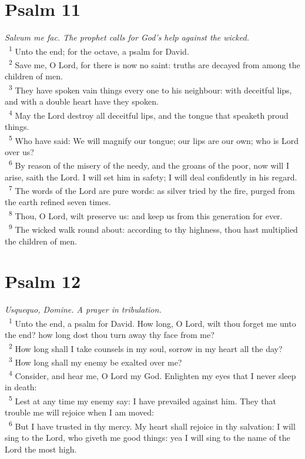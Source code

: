 \documentclass[a5paper,12pt]{article}
\begin{document}
\begin{multicols*}{2}
\section{Psalm 11}
\label{sec:org908cd06}
\emph{Salvum me fac. The prophet calls for God's help against the wicked.}\\

~\textsuperscript{1} Unto the end; for the octave, a psalm for David.\\
~\textsuperscript{2} Save me, O Lord, for there is now no saint: truths are decayed from among the children of men.\\
~\textsuperscript{3} They have spoken vain things every one to his neighbour: with deceitful lips, and with a double heart have they spoken.\\
~\textsuperscript{4} May the Lord destroy all deceitful lips, and the tongue that speaketh proud things.\\
~\textsuperscript{5} Who have said: We will magnify our tongue; our lips are our own; who is Lord over us?\\
~\textsuperscript{6} By reason of the misery of the needy, and the groans of the poor, now will I arise, saith the Lord. I will set him in safety; I will deal confidently in his regard.\\
~\textsuperscript{7} The words of the Lord are pure words: as silver tried by the fire, purged from the earth refined seven times.\\
~\textsuperscript{8} Thou, O Lord, wilt preserve us: and keep us from this generation for ever.\\
~\textsuperscript{9} The wicked walk round about: according to thy highness, thou hast multiplied the children of men.\\

\section{Psalm 12}
\label{sec:orgb829b37}
\emph{Usquequo, Domine. A prayer in tribulation.}\\

~\textsuperscript{1} Unto the end, a psalm for David. How long, O Lord, wilt thou forget me unto the end? how long dost thou turn away thy face from me?\\
~\textsuperscript{2} How long shall I take counsels in my soul, sorrow in my heart all the day?\\
~\textsuperscript{3} How long shall my enemy be exalted over me?\\
~\textsuperscript{4} Consider, and hear me, O Lord my God. Enlighten my eyes that I never sleep in death:\\
~\textsuperscript{5} Lest at any time my enemy say: I have prevailed against him. They that trouble me will rejoice when I am moved:\\
~\textsuperscript{6} But I have trusted in thy mercy. My heart shall rejoice in thy salvation: I will sing to the Lord, who giveth me good things: yea I will sing to the name of the Lord the most high.\\


\end{multicols*}
\end{document}
